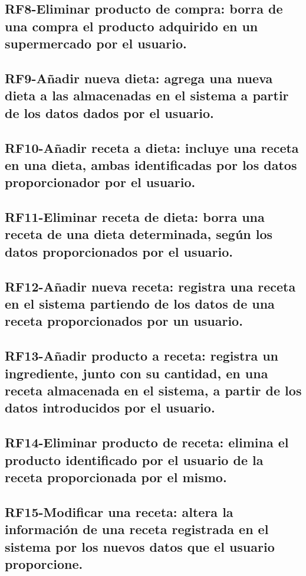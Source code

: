 \documentclass[a4paper,12pt]{report}
\begin{document}
\subsection{\textbf{RF8-Eliminar producto de compra}: borra de una compra el producto adquirido en un supermercado  por el usuario.}
\label{sec-2-2-8}

\subsection{\textbf{RF9-Añadir nueva dieta}: agrega una nueva dieta a las almacenadas en el sistema a partir de los datos dados por el usuario.}
\label{sec-2-2-9}

\subsection{\textbf{RF10-Añadir receta a dieta}: incluye una receta en una dieta, ambas identificadas por los datos proporcionador por el usuario.}
\label{sec-2-2-10}

\subsection{\textbf{RF11-Eliminar receta de dieta}: borra una receta de una dieta determinada, según los datos proporcionados por el usuario.}
\label{sec-2-2-11}

\subsection{\textbf{RF12-Añadir nueva receta}: registra una receta en el sistema partiendo de los datos de una receta proporcionados por un usuario.}
\label{sec-2-2-12}

\subsection{\textbf{RF13-Añadir producto a receta}: registra un ingrediente, junto con su cantidad, en una receta almacenada en el sistema, a partir de los datos introducidos por el usuario.}
\label{sec-2-2-13}

\subsection{\textbf{RF14-Eliminar producto de receta}: elimina el producto identificado por el usuario de la receta proporcionada por el mismo.}
\label{sec-2-2-14}

\subsection{\textbf{RF15-Modificar una receta}: altera la información de una receta registrada en el sistema por los nuevos datos que el usuario proporcione.}
\label{sec-2-2-15}
\end{document}
